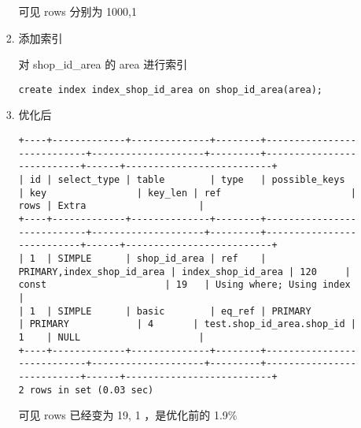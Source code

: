 \documentclass[11pt]{article}
\begin{document}
\begin{itemize}
\begin{enumerate}
\begin{enumerate}
可见 rows 分别为 1000,1

\item 添加索引

对 shop\_id\_area 的 area 进行索引

\begin{lstlisting}
create index index_shop_id_area on shop_id_area(area);
\end{lstlisting}

\item 优化后

\begin{verbatim}
+----+-------------+--------------+--------+----------------------------+--------------------+---------+---------------------------+------+--------------------------+
| id | select_type | table        | type   | possible_keys              | key                | key_len | ref                       | rows | Extra                    |
+----+-------------+--------------+--------+----------------------------+--------------------+---------+---------------------------+------+--------------------------+
| 1  | SIMPLE      | shop_id_area | ref    | PRIMARY,index_shop_id_area | index_shop_id_area | 120     | const                     | 19   | Using where; Using index |
| 1  | SIMPLE      | basic        | eq_ref | PRIMARY                    | PRIMARY            | 4       | test.shop_id_area.shop_id | 1    | NULL                     |
+----+-------------+--------------+--------+----------------------------+--------------------+---------+---------------------------+------+--------------------------+
2 rows in set (0.03 sec)
\end{verbatim}

可见 rows 已经变为 19, 1 ，是优化前的 1.9\%
\end{enumerate}
\end{enumerate}
\end{itemize}
\end{document}
